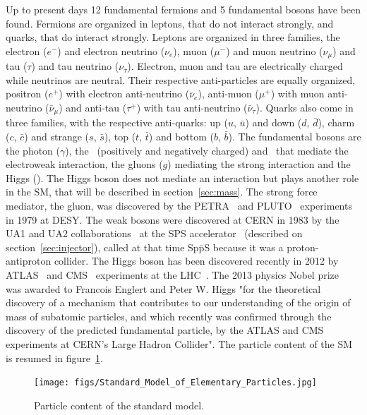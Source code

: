 Up to present days 12 fundamental fermions and 5 fundamental bosons have been found. Fermions are organized in leptons, that do not interact strongly, and quarks, that do interact strongly. Leptons are organized in three families, the electron ($e^{-}$) and electron neutrino ($\nu_{e}$), muon ($\mu^{-}$) and muon neutrino ($\nu_{\mu}$) and tau ($\tau$) and tau neutrino ($\nu_{\tau}$). Electron, muon and tau are electrically charged while neutrinos are neutral. Their respective anti-particles are equally organized, positron ($e^{+}$) with electron anti-neutrino ($\bar{\nu}_{e}$), anti-muon ($\mu^{+}$) with muon anti-neutrino ($\bar{\nu}_{\mu}$) and anti-tau ($\tau^{+}$) with tau anti-neutrino ($\bar{\nu}_{\tau}$). Quarks also come in three families, with the respective anti-quarks: up ($u$, $\bar{u}$) and down ($d$, $\bar{d}$), charm ($c$, $\bar{c}$) and strange ($s$, $\bar{s}$), top ($t$, $\bar{t}$) and bottom ($b$, $\bar{b}$). The fundamental bosons are the photon ($\gamma$), the \W~(positively and negatively charged) and \Z~that mediate the electroweak interaction, the gluons ($g$) mediating the strong interaction and the Higgs (\Hb). The Higgs boson does not mediate an interaction but plays another role in the SM, that will be described in section~\ref{sec:mass}. The strong force mediator, the gluon, was discovered by the PETRA~\cite{Brandelik:1979bd} and PLUTO~\cite{Berger:1979cj} experiments in 1979 at DESY. The weak bosons were discovered at CERN in 1983 by the UA1 and UA2 collaborations~\cite{Hansen:1984mw} at the SPS accelerator~\cite{SPS:REF} (described on section~\ref{sec:injector}), called at that time Sp$\bar{\text{p}}$S because it was a proton-antiproton collider. The Higgs boson has been discovered recently in 2012 by ATLAS~\cite{1748-0221-3-08-S08003} and CMS~\cite{1748-0221-3-08-S08004} experiments at the LHC~\cite{Aad:2012tfa, Chatrchyan:2012xdj}. The 2013 physics Nobel prize~\cite{Nobel2013} was awarded to Francois Englert and Peter W. Higgs "for the theoretical discovery of a mechanism that contributes to our understanding of the origin of mass of subatomic particles, and which recently was confirmed through the discovery of the predicted fundamental particle, by the ATLAS and CMS experiments at CERN's Large Hadron Collider". The particle content of the SM is resumed in figure~\ref{fig:SMContent}.

\begin{figure}[!Hhtbp]
  \begin{center}
    \texttt{[image: figs/Standard\_Model\_of\_Elementary\_Particles.jpg]}
    \caption{Particle content of the standard model.}
    \label{fig:SMContent}
  \end{center}
\end{figure}

